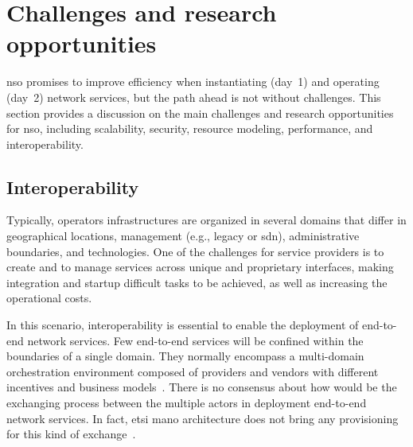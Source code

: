 \section{Challenges and research opportunities}
\label{sec:challenge}

\gls{nso} promises to improve efficiency when instantiating (day~1) and operating (day~2) network services, but the path ahead is not without  challenges. 
This section provides a discussion on the main challenges and research opportunities for \gls{nso}, including scalability, security, resource modeling, performance, and interoperability.




\subsection{Interoperability}

Typically, operators infrastructures are organized in several domains that differ in geographical locations, management (e.g., legacy or \gls{sdn}), administrative boundaries, and technologies. One of the challenges for service providers is to create and to manage services across unique and proprietary interfaces, making integration and startup difficult tasks to be achieved, as well as increasing the operational costs.  

In this scenario, interoperability is essential to enable the deployment of end-to-end network services. Few end-to-end services will be confined within the boundaries of a single domain. They normally encompass a multi-domain orchestration environment composed of providers and vendors with different incentives and business models~\cite{Katsalis2016Multi-DomainDirections}. There is no consensus about how would be the exchanging process between the multiple actors in deployment end-to-end network services. In fact, \gls{etsi} \gls{mano} architecture does not bring any provisioning for this kind of exchange~\cite{ETSIIndustrySpecificationGroupISGNFV2014NetworkNFV}. 

